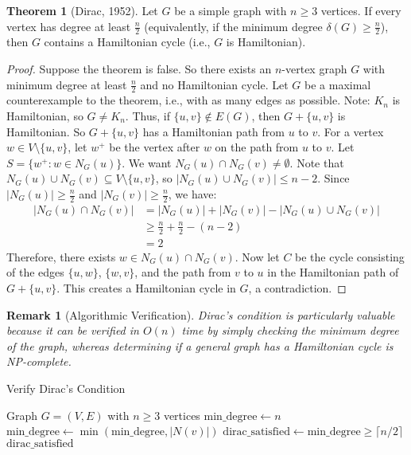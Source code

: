 \documentclass{article}
\newtheorem{remark}{Remark}
\theoremstyle{definition}
\newtheorem{theorem}{Theorem}
\begin{document}
\begin{theorem}[Dirac, 1952]
Let $G$ be a simple graph with $n \geq 3$ vertices. If every vertex has degree at least $\frac{n}{2}$ (equivalently, if the minimum degree $\delta(G) \geq \frac{n}{2}$), then $G$ contains a Hamiltonian cycle (i.e., $G$ is Hamiltonian).
\end{theorem}
\begin{proof}
Suppose the theorem is false. So there exists an $n$-vertex graph $G$ with minimum degree at least $\frac{n}{2}$ and no Hamiltonian cycle.
Let $G$ be a maximal counterexample to the theorem, i.e., with as many edges as possible.
Note: $K_n$ is Hamiltonian, so $G \neq K_n$. Thus, if $\{u,v\} \not\in E(G)$, then $G + \{u,v\}$ is Hamiltonian.
So $G + \{u,v\}$ has a Hamiltonian path from $u$ to $v$.
For a vertex $w \in V \setminus \{u,v\}$, let $w^+$ be the vertex after $w$ on the path from $u$ to $v$.
Let $S = \{w^+ : w \in N_G(u)\}$.
We want $N_G(u) \cap N_G(v) \neq \emptyset$.
Note that $N_G(u) \cup N_G(v) \subseteq V \setminus \{u,v\}$, so $|N_G(u) \cup N_G(v)| \leq n-2$.
Since $|N_G(u)| \geq \frac{n}{2}$ and $|N_G(v)| \geq \frac{n}{2}$, we have:
\begin{align*}
|N_G(u) \cap N_G(v)| &= |N_G(u)| + |N_G(v)| - |N_G(u) \cup N_G(v)|\\
&\geq \frac{n}{2} + \frac{n}{2} - (n-2)\\
&= 2
\end{align*}
Therefore, there exists $w \in N_G(u) \cap N_G(v)$.
Now let $C$ be the cycle consisting of the edges $\{u,w\}$, $\{w,v\}$, and the path from $v$ to $u$ in the Hamiltonian path of $G + \{u,v\}$.
This creates a Hamiltonian cycle in $G$, a contradiction.
\end{proof}
\begin{remark}[Algorithmic Verification]
Dirac's condition is particularly valuable because it can be verified in $O(n)$ time by simply checking the minimum degree of the graph, whereas determining if a general graph has a Hamiltonian cycle is NP-complete.
\end{remark}
\begin{algorithm}
\caption{Verify Dirac's Condition}
\begin{algorithmic}[1]
\Require Graph $G = (V, E)$ with $n \geq 3$ vertices
\State $\text{min\_degree} \gets n$
    \State $\text{min\_degree} \gets \min(\text{min\_degree}, |N(v)|)$
\EndFor
\State $\text{dirac\_satisfied} \gets \text{min\_degree} \geq \lceil n/2 \rceil$
\State \Return $\text{dirac\_satisfied}$
\end{algorithmic}
\end{algorithm}
\end{document}
